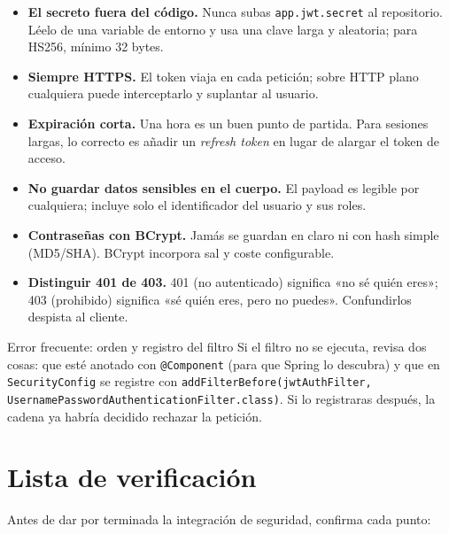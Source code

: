 \documentclass[11pt]{article}
\begin{document}
\begin{itemize}[leftmargin=1.4em,itemsep=3pt,topsep=2pt]
\item \textbf{El secreto fuera del código.} Nunca subas \texttt{app.jwt.secret} al repositorio. Léelo de una variable de entorno y usa una clave larga y aleatoria; para HS256, mínimo 32 bytes.
\item \textbf{Siempre HTTPS.} El token viaja en cada petición; sobre HTTP plano cualquiera puede interceptarlo y suplantar al usuario.
\item \textbf{Expiración corta.} Una hora es un buen punto de partida. Para sesiones largas, lo correcto es añadir un \emph{refresh token} en lugar de alargar el token de acceso.
\item \textbf{No guardar datos sensibles en el cuerpo.} El payload es legible por cualquiera; incluye solo el identificador del usuario y sus roles.
\item \textbf{Contraseñas con BCrypt.} Jamás se guardan en claro ni con hash simple (MD5/SHA). BCrypt incorpora sal y coste configurable.
\item \textbf{Distinguir 401 de 403.} 401 (no autenticado) significa «no sé quién eres»; 403 (prohibido) significa «sé quién eres, pero no puedes». Confundirlos despista al cliente.
\end{itemize}

\begin{cajawarn}{Error frecuente: orden y registro del filtro}
Si el filtro no se ejecuta, revisa dos cosas: que esté anotado con \texttt{@Component} (para que Spring lo descubra) y que en \texttt{SecurityConfig} se registre con \texttt{addFilterBefore(jwtAuthFilter, UsernamePasswordAuthenticationFilter.class)}. Si lo registraras después, la cadena ya habría decidido rechazar la petición.\par
\end{cajawarn}

\section{Lista de verificación}
Antes de dar por terminada la integración de seguridad, confirma cada punto:
\end{document}
